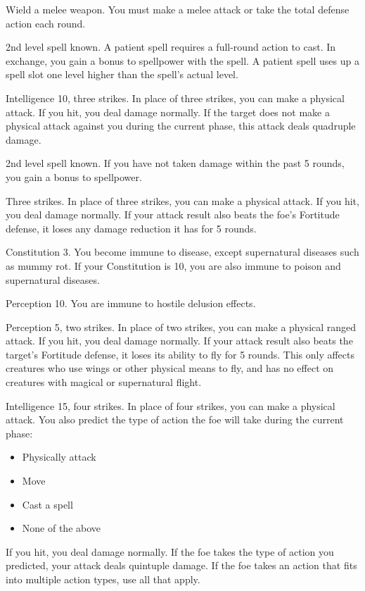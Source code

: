\stylereq Wield a melee weapon.
You must make a melee attack or take the total defense action each round.

\featpre 2nd level spell known.
\featben A patient spell requires a full-round action to cast.
In exchange, you gain a  bonus to spellpower with the spell.
A patient spell uses up a spell slot one level higher than the spell's actual level.

\featpre Intelligence 10, three strikes.
\featben In place of three strikes, you can make a physical attack.
If you hit, you deal damage normally.
If the target does not make a physical attack against you during the current phase, this attack deals quadruple damage.

\featpre 2nd level spell known.
\featben If you have not taken damage within the past 5 rounds, you gain a  bonus to spellpower.

\featpre Three strikes.
\featben In place of three strikes, you can make a physical attack.
If you hit, you deal damage normally.
If your attack result also beats the foe's Fortitude defense, it loses any damage reduction it has for 5 rounds.

\featpre Constitution 3.
\featben You become immune to disease, except supernatural diseases such as mummy rot.
If your Constitution is 10, you are also immune to poison and supernatural diseases.

\featpre Perception 10.
\featben You are immune to hostile delusion effects.

\featpre Perception 5, two strikes.
\featben In place of two strikes, you can make a physical ranged attack.
If you hit, you deal damage normally.
If your attack result also beats the target's Fortitude defense, it loses its ability to fly for 5 rounds.
This only affects creatures who use wings or other physical means to fly, and has no effect on creatures with magical or supernatural flight.

\featpre Intelligence 15, four strikes.
\featben In place of four strikes, you can make a physical attack.
You also predict the type of action the foe will take during the current phase:
\begin{itemize}
    \item Physically attack
    \item Move
    \item Cast a spell
    \item None of the above
\end{itemize}
If you hit, you deal damage normally.
If the foe takes the type of action you predicted, your attack deals quintuple damage.
If the foe takes an action that fits into multiple action types, use all that apply.

